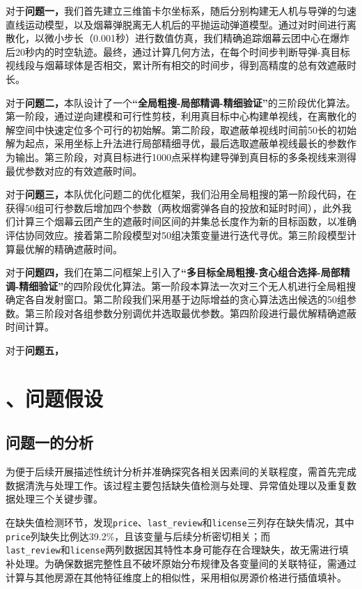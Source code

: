 \documentclass[12pt]{article}
\begin{document}
\begin{CJK}{UTF8}{gbsn}
	
	对于\textbf{问题一，}我们首先建立三维笛卡尔坐标系，随后分别构建无人机与导弹的匀速直线运动模型，以及烟幕弹脱离无人机后的平抛运动弹道模型。通过对时间进行离散化，以微小步长（0.001秒）进行数值仿真，我们精确追踪烟幕云团中心在爆炸后20秒内的时空轨迹。最终，通过计算几何方法，在每个时间步判断导弹-真目标视线段与烟幕球体是否相交，累计所有相交的时间步，得到高精度的总有效遮蔽时长。
	
	对于\textbf{问题二，}本队设计了一个\textbf{“全局粗搜-局部精调-精细验证”}的三阶段优化算法。第一阶段，通过逆向建模和可行性剪枝，利用真目标中心构建单视线，在离散化的解空间中快速定位多个可行的初始解。第二阶段，取遮蔽单视线时间前50长的初始解为起点，采用坐标上升法进行局部精细寻优，最后选取遮蔽单视线最长的参数作为输出。第三阶段，对真目标进行1000点采样构建导弹到真目标的多条视线来测得最优参数对应的有效遮蔽时间。
	
	对于\textbf{问题三，}本队优化问题二的优化框架，我们沿用全局粗搜的第一阶段代码，在获得50组可行参数后增加四个参数（两枚烟雾弹各自的投放和延时时间），此外我们计算三个烟幕云团产生的遮蔽时间区间的并集总长度作为新的目标函数，以准确评估协同效应。接着第二阶段模型对50组决策变量进行迭代寻优。第三阶段模型计算最优解的精确遮蔽时间。
	
	对于\textbf{问题四，}我们在第二问框架上引入了\textbf{“多目标全局粗搜-贪心组合选择-局部精调-精细验证”}的四阶段优化算法。第一阶段本算法一次对三个无人机进行全局粗搜确定各自发射窗口。第二阶段我们采用基于边际增益的贪心算法选出候选的50组参数。第三阶段对各组参数分别调优并选取最优参数。第四阶段进行最优解精确遮蔽时间计算。
	
	对于\textbf{问题五，}
	
	
	
	\section{、问题假设}
	\subsection{问题一的分析}
	为便于后续开展描述性统计分析并准确探究各相关因素间的关联程度，需首先完成数据清洗与处理工作。该过程主要包括缺失值检测与处理、异常值处理以及重复数据处理三个关键步骤。
	
	在缺失值检测环节，发现\texttt{price}、\texttt{last\_review}和\texttt{license}三列存在缺失情况，其中\texttt{price}列缺失比例达39.2\%，且该变量与后续分析密切相关；而\\\texttt{last\_review}和\texttt{license}两列数据因其特性本身可能存在合理缺失，故无需进行填补处理。为确保数据完整性且不破坏原始分布规律及各变量间的关联特征，需通过计算与其他房源在其他特征维度上的相似性，采用相似房源价格进行插值填补。
	

\end{CJK}
\end{document}
